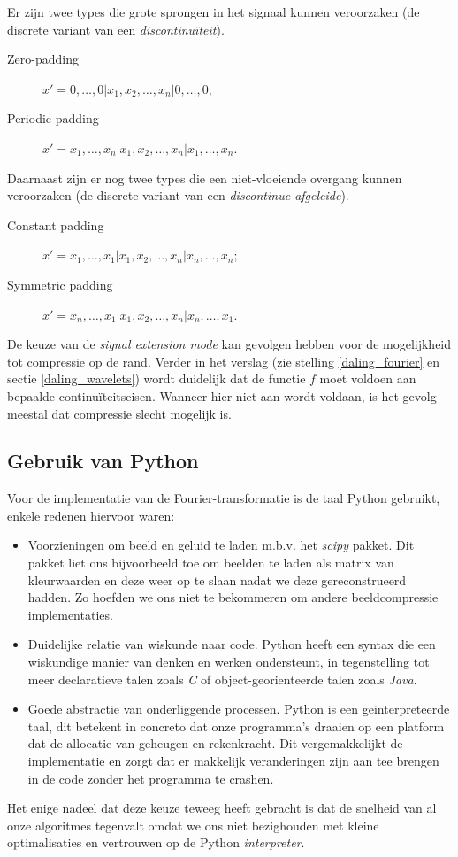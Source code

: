 Er zijn twee types die grote sprongen in het signaal kunnen veroorzaken (de discrete variant van een \emph{discontinu\"iteit}).
\begin{description}
\item[Zero-padding] $x' = 0, \ldots, 0| x_1, x_2, \ldots, x_n| 0, \ldots, 0$;
\item[Periodic padding] $x' = x_1, \ldots, x_n| x_1, x_2, \ldots, x_n| x_1, \ldots, x_n$.
\end{description}
Daarnaast zijn er nog twee types die een niet-vloeiende overgang kunnen veroorzaken (de discrete variant van een \emph{discontinue afgeleide}).
\begin{description}
\item[Constant padding] $x' = x_1, \ldots, x_1| x_1, x_2, \ldots, x_n| x_n, \ldots, x_n$;
\item[Symmetric padding] $x' = x_n, \ldots, x_1| x_1, x_2, \ldots, x_n| x_n, \ldots, x_1$.
\end{description}

De keuze van de \emph{signal extension mode} kan gevolgen hebben voor de mogelijkheid tot compressie op de rand. Verder in het verslag (zie stelling \ref{daling_fourier} en sectie \ref{daling_wavelets}) wordt duidelijk dat de functie $f$ moet voldoen aan bepaalde continu\"iteitseisen. Wanneer hier niet aan wordt voldaan, is het gevolg meestal dat compressie slecht mogelijk is.

\subsection{Gebruik van Python}
Voor de implementatie van de Fourier-transformatie is de taal Python gebruikt,
enkele redenen hiervoor waren:
\begin{itemize}
\item Voorzieningen om beeld en geluid te laden m.b.v. het \emph{scipy} pakket.
  Dit pakket liet ons bijvoorbeeld toe om beelden te laden als matrix van kleurwaarden en deze weer op te slaan
  nadat we deze gereconstrueerd hadden. Zo hoefden we ons niet te bekommeren om andere beeldcompressie implementaties.
\item Duidelijke relatie van wiskunde naar code. Python heeft een syntax die een wiskundige manier van denken en werken
  ondersteunt, in tegenstelling tot meer declaratieve talen zoals \emph{C} of object-georienteerde talen zoals \emph{Java}.
\item Goede abstractie van onderliggende processen. Python is een geinterpreteerde taal, dit betekent in concreto
  dat onze programma's draaien op een platform dat de allocatie van geheugen en rekenkracht. Dit vergemakkelijkt
  de implementatie en zorgt dat er makkelijk veranderingen zijn aan tee brengen in de code zonder het programma te crashen.
\end{itemize}
Het enige nadeel dat deze keuze teweeg heeft gebracht is dat de snelheid van al onze algoritmes tegenvalt
omdat we ons niet bezighouden met kleine optimalisaties en vertrouwen op de Python \emph{interpreter}.

